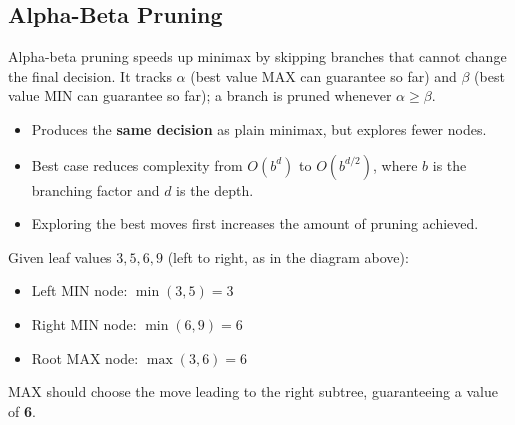 \documentclass[11pt,a4paper]{article}
\begin{document}
\begin{center}
\end{center}

\subsection{Alpha-Beta Pruning}
\begin{conceptbox}
Alpha-beta pruning speeds up minimax by skipping branches that cannot change the final decision. It tracks $\alpha$ (best value MAX can guarantee so far) and $\beta$ (best value MIN can guarantee so far); a branch is pruned whenever $\alpha \geq \beta$.
\end{conceptbox}
\begin{itemize}[leftmargin=*]
  \item Produces the \textbf{same decision} as plain minimax, but explores fewer nodes.
  \item Best case reduces complexity from $O(b^d)$ to $O(b^{d/2})$, where $b$ is the branching factor and $d$ is the depth.
  \item Exploring the best moves first increases the amount of pruning achieved.
\end{itemize}

\begin{examplebox}
Given leaf values $3, 5, 6, 9$ (left to right, as in the diagram above):
\begin{itemize}[leftmargin=*]
  \item Left MIN node: $\min(3,5)=3$
  \item Right MIN node: $\min(6,9)=6$
  \item Root MAX node: $\max(3,6)=6$
\end{itemize}
MAX should choose the move leading to the right subtree, guaranteeing a value of \textbf{6}.
\end{examplebox}
\end{document}
